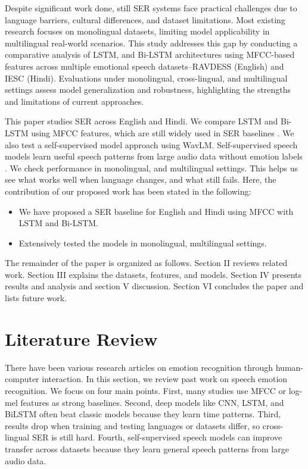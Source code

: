 \documentclass[runningheads]{llncs}
\begin{document}
Despite significant work done, still SER systems face practical challenges due to language barriers, cultural differences, and dataset limitations. Most existing research focuses on monolingual datasets, limiting model applicability in multilingual real-world scenarios. This study addresses this gap by conducting a comparative analysis of LSTM, and Bi-LSTM architectures using MFCC-based features across multiple emotional speech datasets--RAVDESS (English) and IESC (Hindi). Evaluations under monolingual, cross-lingual, and multilingual settings assess model generalization and robustness, highlighting the strengths and limitations of current approaches.

This paper studies SER across English and Hindi. We compare LSTM and Bi-LSTM using MFCC features, which are still widely used in SER baselines \cite{Eyben2010OpenSMILE,Bhattacharya2024MultimodalKFold}. We also test a self-supervised model approach using WavLM. Self-supervised speech models learn useful speech patterns from large audio data without emotion labels \cite{Baevski2020Wav2Vec2,Chen2022WavLM,Hsu2021HuBERT,bhattacharya2022deep}. We check performance in monolingual, and multilingual settings. This helps us see what works well when language changes, and what still fails. Here, the contribution of our proposed work has been stated in the following:
\begin{itemize}
    \item We have proposed a SER baseline for English and Hindi using MFCC with LSTM and Bi-LSTM.
    \item Extensively tested the models in monolingual, multilingual settings.
\end{itemize}

The remainder of the paper is organized as follows.  Section II reviews related work. Section III explains the datasets, features, and models. Section IV presents results and analysis and section V discussion. Section VI concludes the paper and lists future work.

\section{Literature Review}
There have been various research articles on emotion recognition through human-computer interaction. In this section, we review past work on speech emotion recognition. We focus on four main points. First, many studies use MFCC or log-mel features as strong baselines. Second, deep models like CNN, LSTM, and BiLSTM often beat classic models because they learn time patterns. Third, results drop when training and testing languages or datasets differ, so cross-lingual SER is still hard. Fourth, self-supervised speech models can improve transfer across datasets because they learn general speech patterns from large audio data.
\end{document}
